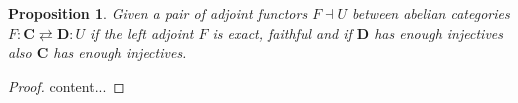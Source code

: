 \documentclass[12pt]{article}
\numberwithin{equation}{section}
\newtheorem{proposition}{Proposition}[section]
\begin{document}
	
	\begin{proposition}\label{adjointinjective}
		Given a pair of adjoint functors $F \dashv U$ between abelian categories $F:\mathbf{C} \rightleftarrows \mathbf{D}:U$ if the left adjoint $F$ is exact, faithful and if $ \mathbf{D}$ has enough injectives also $\mathbf{C}$ has enough injectives.
	\end{proposition}
	\begin{proof}
		content...
	\end{proof}
	
	
	
	
	
\end{document}

